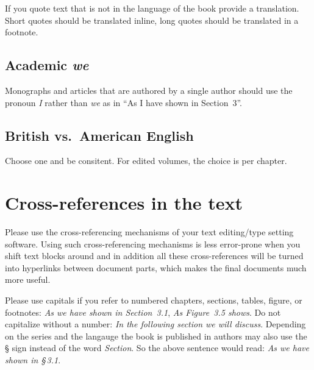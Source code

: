 {If you quote text that is not in the language of the book provide a translation. Short quotes should
be translated inline, long quotes should be translated in a footnote.



\subsection{Academic \emph{we}}

Monographs and articles that are authored by a single author should use the pronoun \emph{I} rather
than \emph{we} as in ``As I have shown in Section~3''.	
 

\subsection{British vs.\ American English}
Choose one and be consitent. For edited volumes, the choice is per chapter.  

\section{Cross-references in the text}

Please use the cross-referencing mechanisms of your text editing/type setting software. Using such
cross-referencing mechanisms is less error-prone when you shift text blocks around and in addition
all these cross-references will be turned into hyperlinks between document parts, which makes the
final documents much more useful.


Please use capitals if you refer to numbered chapters, sections, tables, figure, or footnotes: \emph{As we have shown in
  Section~3.1}, \emph{As Figure~3.5 shows}. Do not capitalize without a number: \emph{In the
  following section we will discuss}.
Depending on the series and the langauge the book is published in authors may also use the § sign
instead of the word \emph{Section}. So the above sentence would read: \emph{As we have shown in
  §\,3.1}.

}
